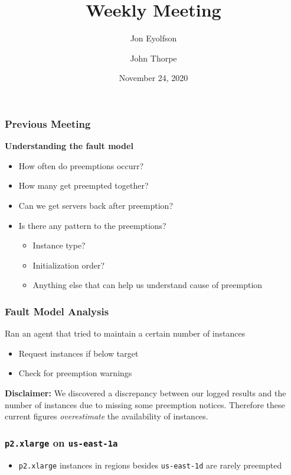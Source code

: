
\title{Weekly Meeting}
\date{November 24, 2020}
\author{Jon Eyolfson \and John Thorpe}



  \begin{frame}[plain]
    \titlepage
  \end{frame}

  \setcounter{framenumber}{0}

  \begin{frame}
    \frametitle{Previous Meeting}
    \textbf{Understanding the fault model}
    \begin{itemize}
      \item How often do preemptions occurr?
      \item How many get preempted together?
      \item Can we get servers back after preemption?
      \item Is there any pattern to the preemptions?
      \begin{itemize}
        \item Instance type?
        \item Initialization order?
        \item Anything else that can help us understand cause of preemption
      \end{itemize}

    \end{itemize}
  \end{frame}

  \begin{frame}
    \frametitle{Fault Model Analysis}

    Ran an agent that tried to maintain a certain number of instances \\
    \begin{itemize}
      \item Request instances if below target
      \item Check for preemption warnings
    \end{itemize}

    \vspace{3em}
    \textbf{Disclaimer:} We discovered a discrepancy between our logged results
      and the number of instances due to missing some preemption notices.
      Therefore these current figures \emph{overestimate} the availability of
      instances.
  \end{frame}

  \begin{frame}
    \frametitle{\texttt{p2.xlarge} on \texttt{us-east-1a}}
    \begin{center}
      
    \end{center}
    \begin{itemize}
      \item \texttt{p2.xlarge} instances in regions besides \texttt{us-east-1d} are rarely preempted
    \end{itemize}

  \end{frame}

